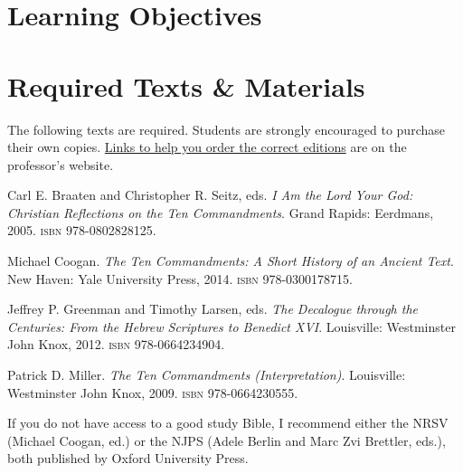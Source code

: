 \documentclass[titlepage]{article}
\newcommand\incl{../includes}
\begin{document}


  \section{Learning Objectives}
  \label{objectives}

  \edobject

\section{Required Texts \& Materials}
\label{texts}

The following texts are required. Students are strongly encouraged to
purchase their own copies. \href{http://danieldriver.com/courses/hb-3113/#required-texts-winter-2018}{Links to help you order the correct editions} are on the professor's website.

\begingroup
\renewcommand{\section}[2]{}%
\begin{thebibliography}{Reflections}%

	 Carl E. Braaten and Christopher R. Seitz, eds.
	\emph{I Am the Lord Your God: Christian Reflections on the Ten Commandments}.
	Grand Rapids: Eerdmans, 2005.
	\textsc{isbn} 978-0802828125.

	 Michael Coogan.
    \emph{The Ten Commandments: A Short History of an Ancient Text}.
    New Haven: Yale University Press, 2014.
    \textsc{isbn} 978-0300178715.

	 Jeffrey P. Greenman and Timothy Larsen, eds.
	\emph{The Decalogue through the Centuries: From the Hebrew Scriptures to Benedict XVI}.
	Louisville: Westminster John Knox, 2012.
	\textsc{isbn} 978-0664234904.

	 Patrick D. Miller.
    \emph{The Ten Commandments (Interpretation)}.
    Louisville: Westminster John Knox, 2009.
    \textsc{isbn} 978-0664230555.

\end{thebibliography}
\endgroup

If you do not have access to a good study Bible, I recommend either the
NRSV (Michael Coogan, ed.) or the NJPS (Adele Berlin and Marc Zvi
Brettler, eds.), both published by Oxford University Press.
\end{document}
